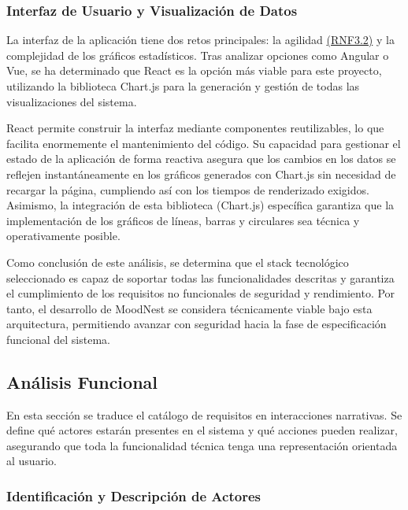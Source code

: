 \subsubsection{Interfaz de Usuario y Visualización de Datos}
La interfaz de la aplicación tiene dos retos principales: la agilidad \hyperref[tab:rnf_total]{(RNF3.2)} y la complejidad de los gráficos estadísticos. Tras analizar opciones como Angular o Vue, se ha determinado que React \cite{bib:react} es la opción más viable para este proyecto, utilizando la biblioteca Chart.js \cite{bib:chartjs} para la generación y gestión de todas las visualizaciones del sistema.

React permite construir la interfaz mediante componentes reutilizables, lo que facilita enormemente el mantenimiento del código. Su capacidad para gestionar el estado de la aplicación de forma reactiva asegura que los cambios en los datos se reflejen instantáneamente en los gráficos generados con Chart.js sin necesidad de recargar la página, cumpliendo así con los tiempos de renderizado exigidos. Asimismo, la integración de esta biblioteca (Chart.js) específica garantiza que la implementación de los gráficos de líneas, barras y circulares sea técnica y operativamente posible.

Como conclusión de este análisis, se determina que el stack tecnológico seleccionado es capaz de soportar todas las funcionalidades descritas y garantiza el cumplimiento de los requisitos no funcionales de seguridad y rendimiento. Por tanto, el desarrollo de MoodNest se considera técnicamente viable bajo esta arquitectura, permitiendo avanzar con seguridad hacia la fase de especificación funcional del sistema.



\newpage



\subsection{Análisis Funcional}

En esta sección se traduce el catálogo de requisitos en interacciones narrativas. Se define qué actores estarán presentes en el sistema y qué acciones pueden realizar, asegurando que toda la funcionalidad técnica tenga una representación orientada al usuario.

\subsubsection{Identificación y Descripción de Actores}

